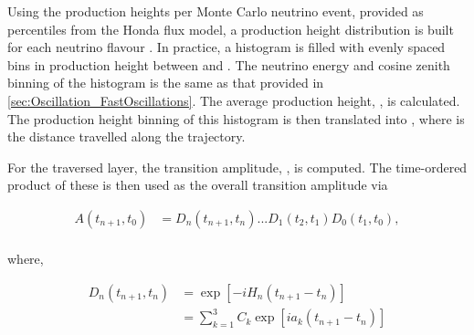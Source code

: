 Using the  production heights per Monte Carlo neutrino event, provided as  percentiles from the Honda flux model, a production height distribution  is built for each neutrino flavour . In practice, a histogram is filled with  evenly spaced bins in production height  between  and . The neutrino energy and cosine zenith binning of the histogram is the same as that provided in \autoref{sec:Oscillation_FastOscillations}. The average production height, , is calculated. The production height binning of this histogram is then translated into , where  is the distance travelled along the trajectory.

For the  traversed layer, the transition amplitude, , is computed. The time-ordered product of these is then used as the overall transition amplitude via

\begin{equation}
  \label{eq:Oscillation_FullTransitionAmplitude}
  \begin{split}
    A(t_{n+1},t_{0}) &= D_{n}(t_{n+1},t_{n})...D_{1}(t_{2},t_{1})D_{0}(t_{1},t_{0}), \\
  \end{split}
\end{equation}

where,

\begin{equation}
  \label{eq:Oscillation_LayerTransitionAmplitude}
  \begin{split}
    D_{n}(t_{n+1},t_{n}) &= \exp[-i H_{n}(t_{n+1} - t_{n})] \\
    &= \sum^{3}_{k=1} C_{k} \exp[ia_{k} (t_{n+1} - t_{n})]
    \end{split}
\end{equation}


